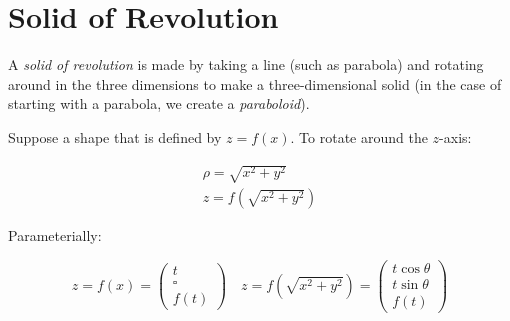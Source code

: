 \documentclass[00_complete]{subfiles}
\begin{document}
\section{Solid of Revolution}

A \emph{solid of revolution} is made by taking a line (such as parabola) and rotating
around in the three dimensions to make a three-dimensional solid (in the case of
starting with a parabola, we create a \emph{paraboloid}).

Suppose a shape that is defined by $z=f(x)$. To rotate around the $z$-axis:

$$
\begin{gathered}
    \rho=\sqrt{x^2+y^2} \\
    z=f\left(\sqrt{x^2+y^2}\right)
\end{gathered}
$$

Parameterially:

$$z=f(x) = \begin{pmatrix}
    t \\ \square \\ f(t)
\end{pmatrix}
\quad
z=f\left(\sqrt{x^2+y^2}\right) = \begin{pmatrix}
    t \cos \theta \\ t \sin \theta \\ f(t)
\end{pmatrix}$$
\end{document}
